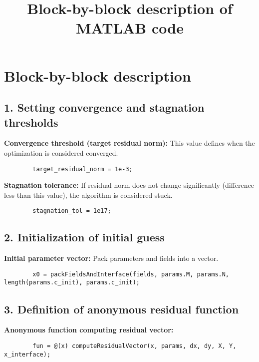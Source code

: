 \documentclass{article}
\title{Block-by-block description of MATLAB code}
\author{}
\date{}
\begin{document}
	
	\maketitle
	
	\section*{Block-by-block description}
	
	\subsection*{1. Setting convergence and stagnation thresholds}
	
	\textbf{Convergence threshold (target residual norm):}  
	This value defines when the optimization is considered converged.
	
	\begin{lstlisting}
		target_residual_norm = 1e-3;
	\end{lstlisting}
	
	\vspace{1em}
	
	\textbf{Stagnation tolerance:}  
	If residual norm does not change significantly (difference less than this value), the algorithm is considered stuck.
	
	\begin{lstlisting}
		stagnation_tol = 1e17;
	\end{lstlisting}
	
	\subsection*{2. Initialization of initial guess}
	
	\textbf{Initial parameter vector:}  
	Pack parameters and fields into a vector.
	
	\begin{lstlisting}
		x0 = packFieldsAndInterface(fields, params.M, params.N, length(params.c_init), params.c_init);
	\end{lstlisting}
	
	\subsection*{3. Definition of anonymous residual function}
	
	\textbf{Anonymous function computing residual vector:}
	
	\begin{lstlisting}
		fun = @(x) computeResidualVector(x, params, dx, dy, X, Y, x_interface);
	\end{lstlisting}
	
\end{document}
